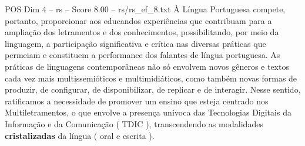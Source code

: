 \begin{textsample}{POS Dim 4 – rs – Score 8.00 – rs/rs\_ef\_8.txt}
À Língua Portuguesa compete, portanto, proporcionar aos educandos experiências que contribuam para a ampliação dos letramentos e dos conhecimentos, possibilitando, por meio da linguagem, a participação significativa e crítica nas diversas práticas que permeiam e constituem a performance dos falantes de língua portuguesa.
As práticas de linguagens contemporâneas não só envolvem novos gêneros e textos cada vez mais multissemióticos e multimidiáticos, como também novas formas de produzir, de configurar, de disponibilizar, de replicar e de interagir.
Nesse sentido, ratificamos a necessidade de promover um ensino que esteja centrado nos Multiletramentos, o que envolve a presença unívoca das Tecnologias Digitais da Informação e da Comunicação ( TDIC ), transcendendo as modalidades \textbf{cristalizadas} da língua ( oral e escrita ).

\end{textsample}
